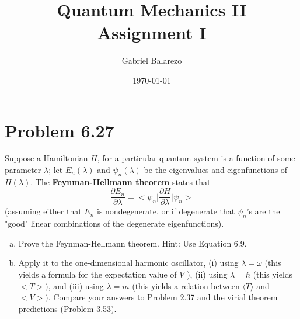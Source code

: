 \documentclass[12 pt]{article}
\title{Quantum Mechanics II\\
Assignment I}
\author{Gabriel Balarezo}
\date{\today}
\numberwithin{equation}{section}
\begin{document}
\maketitle

\section*{Problem 6.27}

Suppose a Hamiltonian $H$, for a  particular quantum system is a function of some parameter
$\lambda$; let $E_n(\lambda)$ and $\psi_n(\lambda)$ be the eigenvalues and eigenfunctions of $H
(\lambda)$. The \textbf{Feynman-Hellmann theorem} states that
\[
  \frac{\partial E_n}{\partial \lambda} = \bigg<\psi_n\bigg|\frac{\partial H}{\partial \lambda}
  \bigg|\psi_n\bigg>
\]
(assuming either that $E_n$ is nondegenerate, or if degenerate that $\psi_n$'s are the 
"good" linear combinations of the degenerate eigenfunctions).
\begin{enumerate}[a)]
  \item Prove the Feynman-Hellmann theorem. Hint: Use Equation 6.9.
  \item Apply it to the one-dimensional harmonic oscillator, (i) using $\lambda=\omega$
    (this yields a formula for the expectation value of $V$ ), (ii) using $\lambda=\hbar$ 
    (this yields $\big<T\big>)$, and (iii) using $\lambda=m$ (this yields a relation between 
    $\langle T\rangle$ and $\big<V\big>)$. Compare your answers to Problem 2.37 and the virial
    theorem predictions (Problem 3.53).
\end{enumerate}
\end{document}
